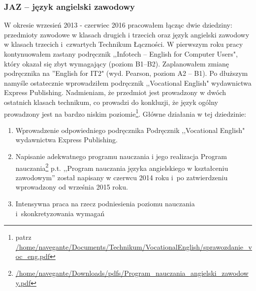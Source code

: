 \documentclass[a4paper,titlepage,13pt,draft]{mwart}
\begin{document}
\begin{flushleft}
\subsubsection{JAZ -- język angielski zawodowy}
W okresie wrzesień 2013 - czerwiec 2016 pracowałem łącząc dwie dziedziny: przedmioty zawodowe w klasach drugich i trzecich oraz język angielski zawodowy w klasach trzecich i~czwartych Technikum Łączności. W pierwszym roku pracy kontynuowałem zastany podręcznik ,,Infotech -- English for Computer Users", który okazał się zbyt wymagający (poziom B1--B2). Zaplanowałem zmianę podręcznika na ''English for IT2" (wyd. Pearson, poziom A2 -- B1). Po dłuższym namyśle ostatecznie wprowadziłem podręcznik ,,Vocational English" wydawnictwa Express Publishing. Nadmieniam, że przedmiot jest prowadzony w dwóch ostatnich klasach technikum, co prowadzi do konkluzji, że język ogólny prowadzony jest na bardzo niskim poziomie\footnote{patrz \url{/home/navegante/Documents/Technikum/VocationalEnglish/sprawozdanie\_voc\_eng.pdf}}.\newline
Główne działania w tej dziedzinie:
\begin{enumerate}
\begin{enumerate}
\item{Wprowadzenie odpowiedniego podręcznika}\newline
Podręcznik ,,Vocational English" wydawnictwa Express Publishing.
\item{Napisanie adekwatnego programu nauczania i jego realizacja}\newline
Program nauczania\footnote{\url{/home/navegante/Downloads/pdfs/Program\_nauczania\_angielski\_zawodowy.pdf}} p.t. ,,Program nauczania języka angielskiego w kształceniu zawodowym'' został napisany w czerwcu 2014 roku i~po zatwierdzeniu wprowadzony od września 2015 roku. 
\item{Intensywna praca na rzecz podniesienia poziomu nauczania i~skonkretyzowania wymagań}
\end{enumerate}
\end{enumerate}

\end{flushleft}
\end{document}
